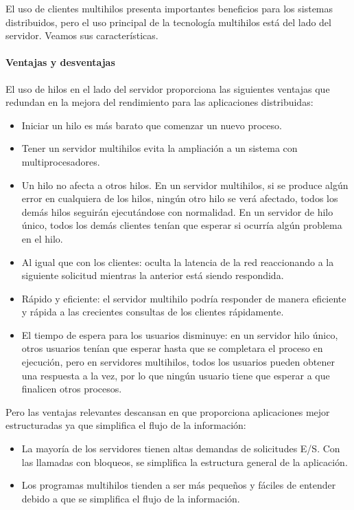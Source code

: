 El uso de clientes multihilos presenta  importantes beneficios para los sistemas distribuidos, pero el uso  principal  de la tecnología multihilos está del lado del servidor.
 Veamos sus caracter\'isticas.
 
	\paragraph{Ventajas y desventajas}
	El uso de hilos en el lado del servidor proporciona las siguientes ventajas que redundan en la mejora del rendimiento  para las aplicaciones distribuidas:

		\begin{itemize}	 	
		     	
			\item Iniciar un hilo es más barato que comenzar un nuevo proceso. 			
			\item Tener un servidor multihilos evita la ampliación a un sistema con  multiprocesadores.
		    \item Un hilo no afecta a otros hilos. En un servidor multihilos, si se produce algún error en cualquiera de los hilos, ningún otro hilo se verá afectado, todos los demás hilos seguirán ejecutándose con normalidad. En un servidor de hilo único, todos los demás clientes tenían que esperar si ocurría algún problema en el hilo.	
			\item  Al igual que con los clientes: oculta la latencia de la red reaccionando a la siguiente solicitud mientras la anterior está siendo respondida.     
		    \item 	Rápido y eficiente: el servidor multihilo podría responder de manera eficiente y rápida a las crecientes consultas de los clientes rápidamente.
		    \item 	El tiempo de espera para los usuarios disminuye: en un servidor hilo único, otros usuarios tenían que esperar hasta que se completara el proceso en ejecución, pero en servidores multihilos, todos los usuarios pueden obtener una respuesta a la vez, por lo que ningún usuario tiene que esperar a que finalicen otros procesos.	 
		\end{itemize}        
 
 
     Pero las ventajas relevantes descansan en que proporciona aplicaciones mejor estructuradas ya que simplifica el flujo de la información:

		\begin{itemize} 
			\item  La mayoría de los servidores tienen altas demandas de solicitudes  E/S. Con las  llamadas con bloqueos, se simplifica la estructura general de la aplicación. 
			
			\item  Los programas multihilos tienden a ser más pequeños y fáciles de entender debido a que se simplifica el flujo de la informaci\'on.
		\end{itemize}
		

